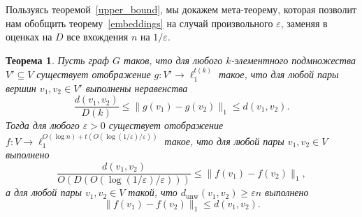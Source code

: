 \documentclass[12pt]{article}
\newcommand{\eps}{\varepsilon}
\newcommand{\dunw}{d_{\mathrm{unw}}}
\newtheorem{theorem}{Теорема}
\begin{document}
    Пользуясь теоремой~\ref{upper_bound}, мы докажем мета-теорему, которая позволит нам обобщить теорему~\ref{embeddings}
    на случай произвольного $\eps$, заменяя в оценках на $D$ все вхождения $n$ на $1 / \eps$.

    \begin{theorem}
        \label{subsampling}
        Пусть граф $G$ таков, что для любого $k$-элементного подмножества $V' \subseteq V$
        существует отображение $g \colon V' \to \ell_1^{t(k)}$ такое, что для любой пары вершин $v_1, v_2 \in V'$
        выполнены неравенства
        $$
            \frac{d(v_1, v_2)}{D(k)} \leq \|g(v_1) - g(v_2)\|_1 \leq d(v_1, v_2).
        $$
        Тогда для любого $\eps > 0$ существует отображение $f \colon V \to \ell_1^{O(\log n) + t(O(\log(1 / \eps) / \eps))}$
        такое, что для любой пары $v_1, v_2 \in V$ выполнено
        $$
            \frac{d(v_1, v_2)}{O(D(O(\log(1 / \eps) / \eps)))} \leq \|f(v_1) - f(v_2)\|_1,
        $$
        а для любой пары $v_1, v_2 \in V$ такой, что $\dunw(v_1, v_2) \geq \eps n$ выполнено
        $$
            \|f(v_1) - f(v_2)\|_1 \leq d(v_1, v_2).
        $$
    \end{theorem}
\end{document}
